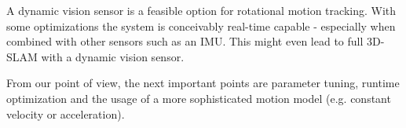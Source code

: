 A dynamic vision sensor is a feasible option for rotational motion tracking. With
some optimizations the system is conceivably real-time capable - especially
when combined with other sensors such as an IMU. This might even lead to full
3D-SLAM with a dynamic vision sensor.

From our point of view, the next important points are parameter tuning, runtime
optimization and the usage of a more sophisticated motion model (e.g. constant
velocity or acceleration).
